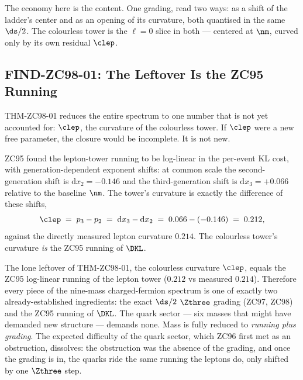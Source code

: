 \documentclass[12pt, a4paper]{article}
\begin{document}
The economy here is the content. One grading, read two ways: as a shift of the
ladder's center and as an opening of its curvature, both quantised in the same
$\ds/2$. The colourless tower is the $\ell=0$ slice in both --- centered at
$\nm$, curved only by its own residual $\clep$.


\subsection{FIND-ZC98-01: The Leftover Is the ZC95 Running}
\label{sec:gift-zc98}

THM-ZC98-01 reduces the entire spectrum to one number that is not yet accounted
for: $\clep$, the curvature of the colourless tower. If $\clep$ were a new free
parameter, the closure would be incomplete. It is not new.

\begin{genealogybox}[title={Where $\clep$ comes from}]
ZC95 found the lepton-tower running to be log-linear in the per-event KL cost,
with generation-dependent exponent shifts: at common scale the second-generation
shift is $\mathrm{d}x_2=-0.146$ and the third-generation shift is
$\mathrm{d}x_3=+0.066$ relative to the baseline $\nm$. The tower's curvature is
exactly the difference of these shifts,
\[
  \clep \;=\; p_3 - p_2 \;=\; \mathrm{d}x_3-\mathrm{d}x_2
        \;=\; 0.066-(-0.146)\;=\;0.212,
\]
against the directly measured lepton curvature $0.214$. The colourless tower's
curvature \emph{is} the ZC95 running of $\DKL$.
\end{genealogybox}

\begin{giftbox}[title={FIND-ZC98-01: The Quark Sector Adds No New Freedom}]
The lone leftover of THM-ZC98-01, the colourless curvature $\clep$, equals the
ZC95 log-linear running of the lepton tower ($0.212$ vs measured $0.214$).
Therefore every piece of the nine-mass charged-fermion spectrum is one of
exactly two already-established ingredients: the exact $\ds/2$ $\Zthree$ grading
(ZC97, ZC98) and the ZC95 running of $\DKL$. The quark sector --- six masses
that might have demanded new structure --- demands none. Mass is fully reduced
to \emph{running plus grading}. The expected difficulty of the quark sector,
which ZC96 first met as an obstruction, dissolves: the obstruction was the
absence of the grading, and once the grading is in, the quarks ride the same
running the leptons do, only shifted by one $\Zthree$ step.
\end{giftbox}
\end{document}
